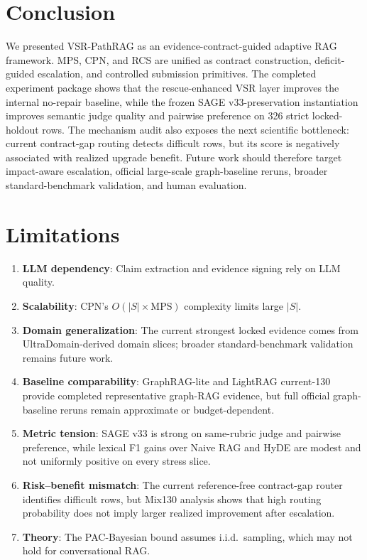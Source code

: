 \documentclass[journal,onecolumn,11pt]{IEEEtran}
\begin{document}
\section{Conclusion}

We presented VSR-PathRAG as an evidence-contract-guided adaptive RAG framework. MPS, CPN, and RCS are unified as contract construction, deficit-guided escalation, and controlled submission primitives. The completed experiment package shows that the rescue-enhanced VSR layer improves the internal no-repair baseline, while the frozen SAGE v33-preservation instantiation improves semantic judge quality and pairwise preference on 326 strict locked-holdout rows. The mechanism audit also exposes the next scientific bottleneck: current contract-gap routing detects difficult rows, but its score is negatively associated with realized upgrade benefit. Future work should therefore target impact-aware escalation, official large-scale graph-baseline reruns, broader standard-benchmark validation, and human evaluation.


\section*{Limitations}

\begin{enumerate}
\item \textbf{LLM dependency}: Claim extraction and evidence signing rely on LLM quality.
\item \textbf{Scalability}: CPN's $O(|S| \times \text{MPS})$ complexity limits large $|S|$.
\item \textbf{Domain generalization}: The current strongest locked evidence comes from UltraDomain-derived domain slices; broader standard-benchmark validation remains future work.
\item \textbf{Baseline comparability}: GraphRAG-lite and LightRAG current-130 provide completed representative graph-RAG evidence, but full official graph-baseline reruns remain approximate or budget-dependent.
\item \textbf{Metric tension}: SAGE v33 is strong on same-rubric judge and pairwise preference, while lexical F1 gains over Naive RAG and HyDE are modest and not uniformly positive on every stress slice.
\item \textbf{Risk--benefit mismatch}: The current reference-free contract-gap router identifies difficult rows, but Mix130 analysis shows that high routing probability does not imply larger realized improvement after escalation.
\item \textbf{Theory}: The PAC-Bayesian bound assumes i.i.d.\ sampling, which may not hold for conversational RAG.
\end{enumerate}
\end{document}

